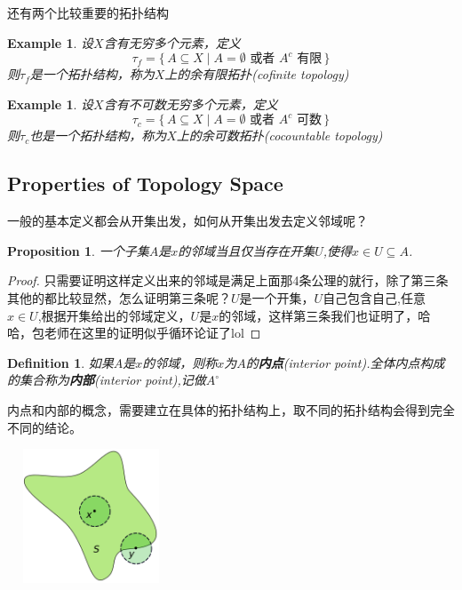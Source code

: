 \documentclass{article}
\newtheorem{proposition}[theorem]{Proposition}
\newtheorem{example}[theorem]{Example}
\newtheorem{definition}[theorem]{Definition}
\newcommand\Set[2]{\{\,#1\mid#2\,\}} %
\begin{document}
还有两个比较重要的拓扑结构

\begin{example}
设$X$含有无穷多个元素，定义\[\tau_f = \Set{A \subseteq X}{A = \emptyset \text{ 或者 } A^c \text{ 有限}}\]则$\tau_f$是一个拓扑结构，称为$X$上的余有限拓扑(cofinite topology)
\end{example}

\begin{example}
设$X$含有不可数无穷多个元素，定义\[\tau_c = \Set{A \subseteq X}{A = \emptyset \text{ 或者 } A^c \text{ 可数}}\]则$\tau_c$也是一个拓扑结构，称为$X$上的余可数拓扑(cocountable topology)
\end{example}


\newpage
\subsection{Properties of Topology Space}

一般的基本定义都会从开集出发，如何从开集出发去定义邻域呢？

\begin{proposition}
一个子集$A$是$x$的邻域当且仅当存在开集$U$,使得$x \in U \subseteq A$.
\end{proposition}

\begin{proof}
只需要证明这样定义出来的邻域是满足上面那4条公理的就行，除了第三条其他的都比较显然，怎么证明第三条呢？$U$是一个开集，$U$自己包含自己,任意$x \in U$,根据开集给出的邻域定义，$U$是$x$的邻域，这样第三条我们也证明了，哈哈，包老师在这里的证明似乎循环论证了lol
\end{proof}


\begin{definition}
如果$A$是$x$的邻域，则称$x$为$A$的\textbf{内点}(interior point).全体内点构成的集合称为\textbf{内部}(interior point),记做$A^{\circ}$
\end{definition}

内点和内部的概念，需要建立在具体的拓扑结构上，取不同的拓扑结构会得到完全不同的结论。

\begin{center}
\includegraphics[width=5cm, height=4cm]{images/Interior_illustration.png}
\end{center}
\end{document}
